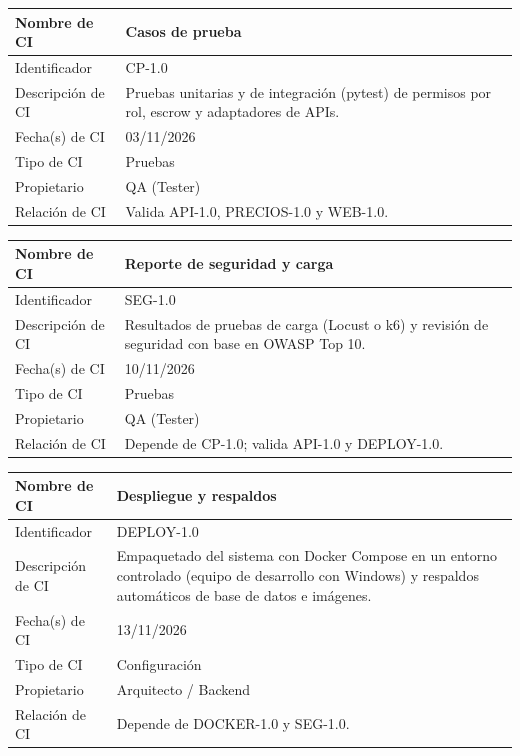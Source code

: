 \documentclass[letterpaper,11pt]{article}
\begin{document}
\noindent\begin{minipage}{\textwidth}
\small\renewcommand{\arraystretch}{1.9}
\begin{tabularx}{\textwidth}{|p{3.3cm}|Y|}
\hline
Nombre de CI & Casos de prueba \\ \hline
Identificador & CP-1.0 \\ \hline
Descripción de CI & Pruebas unitarias y de integración (pytest) de permisos por rol, escrow y adaptadores de APIs. \\ \hline
Fecha(s) de CI & 03/11/2026 \\ \hline
Tipo de CI & Pruebas \\ \hline
Propietario & QA (Tester) \\ \hline
Relación de CI & Valida API-1.0, PRECIOS-1.0 y WEB-1.0. \\ \hline
\end{tabularx}
\end{minipage}\par\bigskip
\noindent\begin{minipage}{\textwidth}
\small\renewcommand{\arraystretch}{1.9}
\begin{tabularx}{\textwidth}{|p{3.3cm}|Y|}
\hline
Nombre de CI & Reporte de seguridad y carga \\ \hline
Identificador & SEG-1.0 \\ \hline
Descripción de CI & Resultados de pruebas de carga (Locust o k6) y revisión de seguridad con base en OWASP Top 10. \\ \hline
Fecha(s) de CI & 10/11/2026 \\ \hline
Tipo de CI & Pruebas \\ \hline
Propietario & QA (Tester) \\ \hline
Relación de CI & Depende de CP-1.0; valida API-1.0 y DEPLOY-1.0. \\ \hline
\end{tabularx}
\end{minipage}\par\bigskip
\noindent\begin{minipage}{\textwidth}
\small\renewcommand{\arraystretch}{1.9}
\begin{tabularx}{\textwidth}{|p{3.3cm}|Y|}
\hline
Nombre de CI & Despliegue y respaldos \\ \hline
Identificador & DEPLOY-1.0 \\ \hline
Descripción de CI & Empaquetado del sistema con Docker Compose en un entorno controlado (equipo de desarrollo con Windows) y respaldos automáticos de base de datos e imágenes. \\ \hline
Fecha(s) de CI & 13/11/2026 \\ \hline
Tipo de CI & Configuración \\ \hline
Propietario & Arquitecto / Backend \\ \hline
Relación de CI & Depende de DOCKER-1.0 y SEG-1.0. \\ \hline
\end{tabularx}
\end{minipage}\par\bigskip
\end{document}
